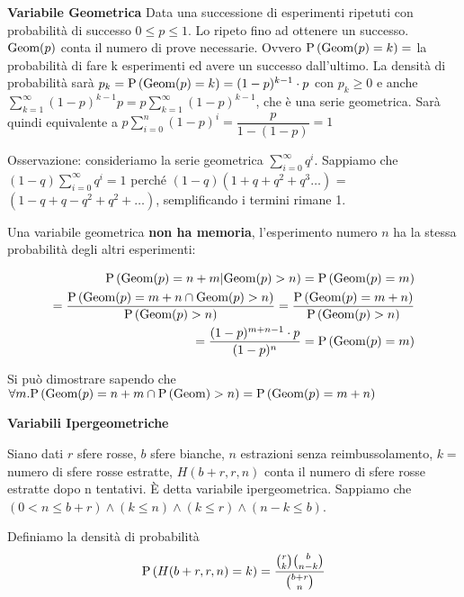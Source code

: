 \begin{defn}
	\textbf{Variabile Geometrica}
	Data una successione di esperimenti ripetuti con probabilità di successo $ 0 \leq p \leq 1 $. Lo ripeto fino ad ottenere un successo. $ \text{Geom}(p) $ conta il numero di prove necessarie. Ovvero $ \text{P}\left(\text{Geom}(p) = k\right) = $ la probabilità di fare k esperimenti ed avere un successo dall'ultimo. La densità di probabilità sarà $ p_k = \text{P}\left(\text{Geom}(p) = k\right) = (1-p)^{k-1} \cdot p $ con $ p_k \geq 0 $ e anche $ \sum_{k=1}^{\infty} (1-p)^{k-1} p = p \sum_{k=1}^{\infty}(1-p)^{k-1} $, che è una serie geometrica. Sarà quindi equivalente a $ p \sum_{i=0}^{n} (1-p)^i = \dfrac{p}{1-(1-p)} = 1$
	
	
	Osservazione: consideriamo la serie geometrica $ \sum_{i=0}^{\infty} q^i $.
	Sappiamo che $ (1-q) \sum_{i=0}^{\infty} q^i = 1 $ perché $ (1-q)(1+q+q^2+q^3\dots) $ = $( 1 - q + q - q^2 + q^2 + \dots )$, semplificando i termini rimane 1.
	
	Una variabile geometrica \textbf{non ha memoria}, l'esperimento numero $ n $ ha la stessa probabilità degli altri esperimenti:
	
	\begin{equation*}
	\begin{aligned}
	\text{P}\left(\text{Geom}(p) = n+m | \text{Geom}(p) > n\right) = \text{P}\left(\text{Geom}(p) = m\right) \\
	= \dfrac{\text{P}\left(\text{Geom}(p) = m + n \cap \text{Geom}(p) > n\right)}{\text{P}\left(\text{Geom}(p) > n\right)} = \dfrac{\text{P}\left(\text{Geom}(p) = m+n\right)}{\text{P}\left(\text{Geom}(p) > n\right)}\\ 
	= \dfrac{(1-p)^{m+n-1} \cdot p}{(1-p)^n} = \text{P}\left(\text{Geom}(p) = m\right) \\
	\end{aligned}
	\end{equation*}
	
	Si può dimostrare sapendo che $ \forall m . \text{P}\left(\text{Geom}(p) = n+m \cap \text{P}\left(\text{Geom}\right) > n\right) = \text{P}\left(\text{Geom}(p) = m+n\right) $
	
\end{defn}

\begin{defn}
	\textbf{Variabili Ipergeometriche}
	
	Siano dati $ r $ sfere rosse, $ b $ sfere bianche, $ n $ estrazioni senza reimbussolamento, $ k = $ numero di sfere rosse estratte, $ H(b+r, r, n) $ conta il numero di sfere rosse estratte dopo n tentativi. È detta variabile ipergeometrica. Sappiamo che $ (0 < n \leq b + r) \land (k \leq n)  \land (k \leq r) \land (n-k \leq b) $.
	
	Definiamo la densità di probabilità
	\begin{equation*}
	\text{P}\left(H(b+r, r, n) = k\right) = \dfrac{\binom{r}{k} \binom{b}{n-k}}{\binom{b+r}{n}}
	\end{equation*}
\end{defn}


